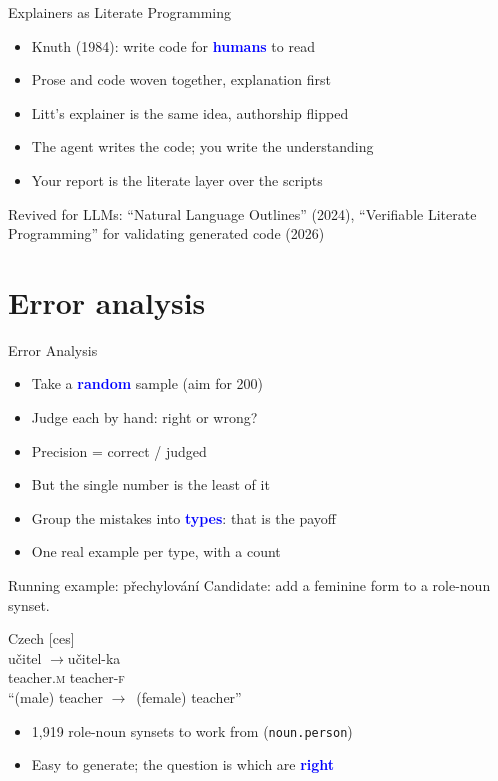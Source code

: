 \documentclass[xetex,aspectratio=169]{beamer}
\newcommand{\gm}[1]{\textsc{\MakeLowercase{#1}}}
\newcommand{\txx}[1]{\textbf{\textcolor{blue}{#1}}}
\newcommand{\into}{\ensuremath{\rightarrow}\xspace}
\begin{document}
\begin{frame}{Explainers as Literate Programming}
  \begin{itemize}
  \item Knuth (1984): write code for \txx{humans} to read
  \item Prose and code woven together, explanation first
  \item Litt's explainer is the same idea, authorship flipped
  \item The agent writes the code; you write the understanding
  \item Your report is the literate layer over the scripts
  \end{itemize}
  \vfill
  \scriptsize Revived for LLMs: ``Natural Language Outlines'' (2024),
  ``Verifiable Literate Programming'' for validating generated code (2026)
\end{frame}

\section{Error analysis}

\begin{frame}{Error Analysis}
  \begin{itemize}
  \item Take a \txx{random} sample (aim for 200)
  \item Judge each by hand: right or wrong?
  \item Precision = correct / judged
  \item But the single number is the least of it
  \item Group the mistakes into \txx{types}: that is the payoff
  \item One real example per type, with a count
  \end{itemize}
\end{frame}

\begin{frame}{Running example: p\v{r}echylov\'an\'i}
  Candidate: add a feminine form to a role-noun synset.
  \begin{exe}
    \ex Czech [ces] \\
        \gll u\v{c}itel \quad\into\quad u\v{c}itel-ka \\
             teacher.\gm{m} \qquad teacher-\gm{f} \\
    \trans ``(male) teacher \into\ (female) teacher''
  \end{exe}
  \begin{itemize}
  \item 1{,}919 role-noun synsets to work from (\texttt{noun.person})
  \item Easy to generate; the question is which are \txx{right}
  \end{itemize}
\end{frame}
\end{document}
